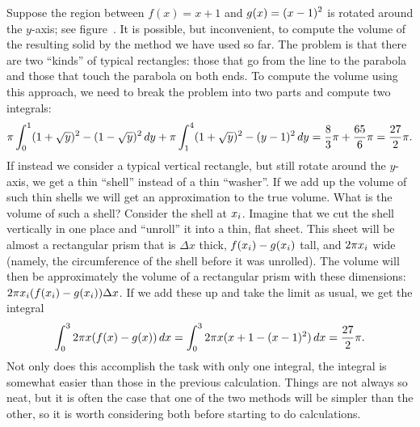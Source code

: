 Suppose the region between $f(x)=x+1$ and $\displaystyle g(x)=(x-1)^2$ is rotated around
the $y$-axis; see figure~. It is possible, but
inconvenient, to compute the  volume of the resulting solid by the
method we have used so far. The problem is that there are two
``kinds'' of typical rectangles: those that go from the line to the
parabola and those that touch the parabola on both ends. To compute
the volume using this approach, we need to break the problem into two
parts and compute two integrals:
$$
  \pi\int_0^1 (1+\sqrt{y})^2-(1-\sqrt{y})^2\,dy+
  \pi\int_1^4  (1+\sqrt{y})^2-(y-1)^2\,dy={8\over3}\pi + {65\over6}\pi
  ={27\over2}\pi.
$$
If instead we consider a typical vertical rectangle, {but still rotate
  around the $y$-axis,} we get a thin ``shell'' instead of a thin
``washer''. If we add up the volume of such thin shells we will get an
approximation to the true volume. What is the volume of such a shell?
Consider the shell at $\displaystyle x_i$.
Imagine that we cut the shell vertically in one place and ``unroll''
it into a thin, flat sheet. This sheet will be almost a rectangular
prism that is $\Delta x$ thick, $\displaystyle f(x_i)-g(x_i)$ tall, and $\displaystyle 2\pi x_i$
wide (namely, the circumference of the shell before it was unrolled).
The volume will then be approximately the volume of a rectangular
prism with these dimensions: $\displaystyle 2\pi x_i(f(x_i)-g(x_i))\Delta x$. If we
add these up and take the limit as usual, we get the integral
$$
  \int_0^3 2\pi x(f(x)-g(x))\,dx=
  \int_0^3 2\pi x(x+1-(x-1)^2)\,dx={27\over2}\pi.
$$
Not only does this accomplish the task with only one integral, the
integral is somewhat easier than those in the previous
calculation. Things are not always so neat, but it is often the case
that one of the two methods will be simpler than the other, so it is
worth considering both before starting to do calculations.

